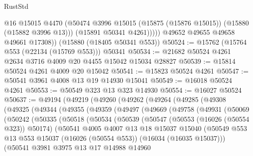 \begin{lexlean}{RustStd}
\begin{coremodule}
                @16
                @15015
                @4470
                (@50474 @3996 @15015 (@15875 (@15876 @15015)) (@15880 (@15882 @3996 @13)))
                (@15891 @50341 @4261)))))
        @49652
        @49655
        @49658
        @49661
        @17308))
    (@15880 (@18405 @50341 @553))
@50524 := @15762 (@15764 @553 (@22134 (@15769 @553))) @50341
@50534 := @21682 @50524 @4261 @2634 @3716 @4009 @20 @4455 @15042 @15034 @28827
@50539 := @15814 @50524 @4261 @4009 @20 @15042
@50541 := @15823 @50524 @4261
@50547 := @50541 @3961 @4008 @13 @19 @14930 @15041
@50549 := @16018 @50524 @4261
@50553 := @50549 @323 @13 @323 @14930
@50554 := @16027 @50524
@50637 := @49194
    (@49219
      (@49260
        (@49262
          (@49264
            (@49285
              (@49308
                (@49325
                  (@49344
                    (@49355
                      (@49359
                        (@49497
                          (@49669
                            (@49758
                              (@49931
                                (@50069
                                  (@50242
                                    (@50335
                                      (@50518
                                        (@50534
                                          (@50539
                                            (@50547
                                              (@50553 (@16026 (@50554 @323)) @50174)
                                              (@50541
                                                @4005
                                                @4007
                                                @13
                                                @18
                                                @15037
                                                @15040
                                                (@50549
                                                  @553
                                                  @13
                                                  @553
                                                  @15037
                                                  (@16026 (@50554 @553))
                                                  (@16034 (@16035 @15037)))
                                                (@50541
                                                  @3981
                                                  @3975
                                                  @13
                                                  @17
                                                  @14988
                                                  @14960

\end{coremodule}
\end{lexlean}
